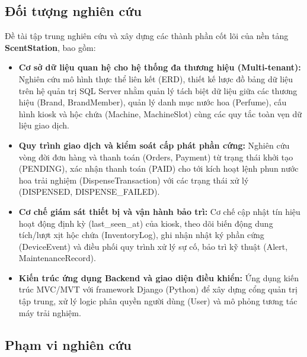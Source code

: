 {\selectfont

\subsection{Đối tượng nghiên cứu}
Đề tài tập trung nghiên cứu và xây dựng các thành phần cốt lõi của nền tảng \textbf{ScentStation}, bao gồm:
\begin{itemize}[leftmargin=1.5cm]
    \item \textbf{Cơ sở dữ liệu quan hệ cho hệ thống đa thương hiệu (Multi-tenant):} Nghiên cứu mô hình thực thể liên kết (ERD), thiết kế lược đồ bảng dữ liệu trên hệ quản trị SQL Server nhằm quản lý tách biệt dữ liệu giữa các thương hiệu (Brand, BrandMember), quản lý danh mục nước hoa (Perfume), cấu hình kiosk và hộc chứa (Machine, MachineSlot) cùng các quy tắc toàn vẹn dữ liệu giao dịch.
    \item \textbf{Quy trình giao dịch và kiểm soát cấp phát phần cứng:} Nghiên cứu vòng đời đơn hàng và thanh toán (Orders, Payment) từ trạng thái khởi tạo (PENDING), xác nhận thanh toán (PAID) cho tới kích hoạt lệnh phun nước hoa trải nghiệm (DispenseTransaction) với các trạng thái xử lý (DISPENSED, DISPENSE\_FAILED).
    \item \textbf{Cơ chế giám sát thiết bị và vận hành bảo trì:} Cơ chế cập nhật tín hiệu hoạt động định kỳ (last\_seen\_at) của kiosk, theo dõi biến động dung tích/lượt xịt hộc chứa (InventoryLog), ghi nhận nhật ký phần cứng (DeviceEvent) và điều phối quy trình xử lý sự cố, bảo trì kỹ thuật (Alert, MaintenanceRecord).
    \item \textbf{Kiến trúc ứng dụng Backend và giao diện điều khiển:} Ứng dụng kiến trúc MVC/MVT với framework Django (Python) để xây dựng cổng quản trị tập trung, xử lý logic phân quyền người dùng (User) và mô phỏng tương tác máy trải nghiệm.
\end{itemize}

\subsection{Phạm vi nghiên cứu}

}
